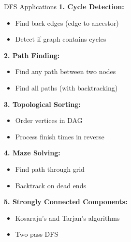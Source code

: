\documentclass[aspectratio=169]{beamer}
\begin{document}
\begin{frame}{DFS Applications}
  \textbf{1. Cycle Detection:}
  \begin{itemize}
    \item Find back edges (edge to ancestor)
    \item Detect if graph contains cycles
  \end{itemize}

  \vspace{0.2cm}
  \textbf{2. Path Finding:}
  \begin{itemize}
    \item Find any path between two nodes
    \item Find all paths (with backtracking)
  \end{itemize}

  \vspace{0.2cm}
  \textbf{3. Topological Sorting:}
  \begin{itemize}
    \item Order vertices in DAG
    \item Process finish times in reverse
  \end{itemize}

  \vspace{0.2cm}
  \textbf{4. Maze Solving:}
  \begin{itemize}
    \item Find path through grid
    \item Backtrack on dead ends
  \end{itemize}

  \vspace{0.2cm}
  \textbf{5. Strongly Connected Components:}
  \begin{itemize}
    \item Kosaraju's and Tarjan's algorithms
    \item Two-pass DFS
  \end{itemize}
\end{frame}
\end{document}
